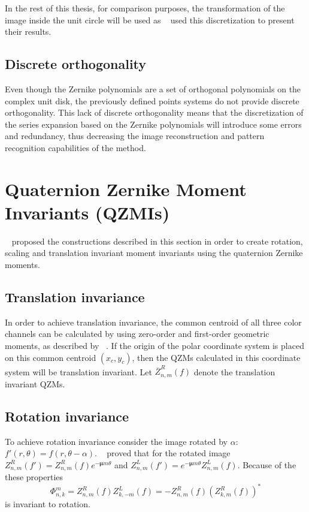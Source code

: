 In the rest of this thesis, for comparison purposes, the transformation of the image inside the unit circle will be used as \citeauthor{qzmi}~\cite{qzmi} used this discretization to present their results.

\subsection{Discrete orthogonality}
Even though the Zernike polynomials are a set of orthogonal polynomials on the complex unit disk, the previously defined points systems do not provide discrete orthogonality. This lack of discrete orthogonality means that the discretization of the series expansion based on the Zernike polynomials will introduce some errors and redundancy, thus decreasing the image reconstruction and pattern recognition capabilities of the method.


\section{Quaternion Zernike Moment Invariants (QZMIs)}
\citeauthor{qzmi}~\cite{qzm, qzmi} proposed the constructions described in this section in order to create rotation, scaling and translation invariant moment invariants using the quaternion Zernike moments.

\subsection{Translation invariance}
In order to achieve translation invariance, the common centroid of all three color channels can be calculated by using zero-order and first-order geometric moments, as described by \citeauthor{affine_color}~\cite{affine_color}.
If the origin of the polar coordinate system is placed on this common centroid $(x_c, y_c)$, then the QZMs calculated in this coordinate system will be translation invariant. Let $\overline{Z}_{n,m}^R(f)$ denote the translation invariant QZMs.

\subsection{Rotation invariance}
To achieve rotation invariance consider the image rotated by $\alpha$: $f'(r,\theta) = f(r, \theta - \alpha)$. \citeauthor{qzmi}~\cite{qzmi} proved that for the rotated image $Z_{n,m}^R(f') = Z_{n,m}^R(f)e^{-\bm{\mu}m\theta}$ and $Z_{n,m}^L(f') = e^{-\bm{\mu}m\theta}Z_{n,m}^L(f)$. Because of the these properties $$\Phi_{n,k}^m = Z_{n,m}^R(f)Z_{k,-m}^L(f) = -Z_{n,m}^R(f)(Z_{k,m}^R(f))^*$$ is invariant to rotation.

